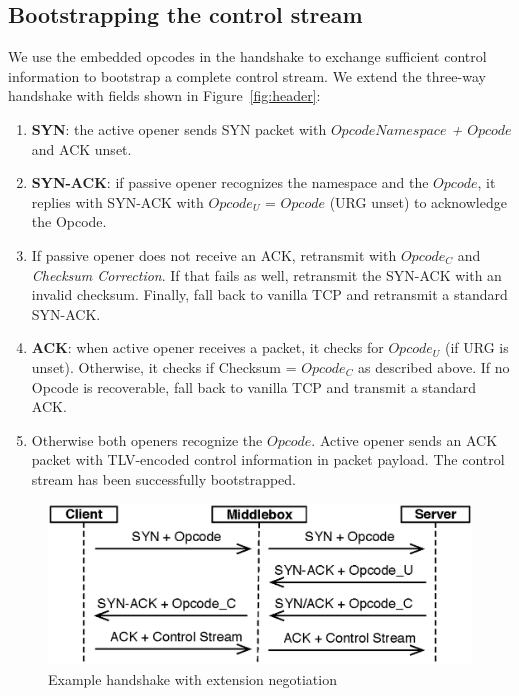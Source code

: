 \documentclass{sig-alternate-10pt}
\begin{document}
\subsection{Bootstrapping the control stream}

We use the embedded opcodes in the handshake to exchange sufficient control information to bootstrap a complete control stream. We extend the three-way handshake with fields shown in Figure~\ref{fig:header}:

\begin{enumerate}
\item \textbf{SYN}: the active opener sends SYN packet with \emph{$Opcode Namespace$ + $Opcode$} and ACK unset.
\item \textbf{SYN-ACK}: if passive opener recognizes the namespace and the $Opcode$, it replies with SYN-ACK with $Opcode_U$ = $Opcode$ (URG unset) to acknowledge the Opcode.
\item If passive opener does not receive an ACK, retransmit with $Opcode_C$ and \emph{Checksum Correction}. If that fails as well, retransmit the SYN-ACK with an invalid checksum. Finally, fall back to vanilla TCP and retransmit a standard SYN-ACK.
\item \textbf{ACK}: when active opener receives a packet, it checks for $Opcode_U$ (if URG is unset). Otherwise, it checks if Checksum = $Opcode_C$ as described above. If no Opcode is recoverable, fall back to vanilla TCP and transmit a standard ACK.
\item Otherwise both openers recognize the $Opcode$. Active opener sends an ACK packet with TLV-encoded control information in packet payload. The control stream has been successfully bootstrapped.
\end{enumerate}

\begin{figure}[t!]
\centering
\includegraphics[width=.9\columnwidth]{figs/handshake}
\caption{Example handshake with extension negotiation}
\label{fig:handshake}
\vspace{-4mm}
\end{figure}
\end{document}
